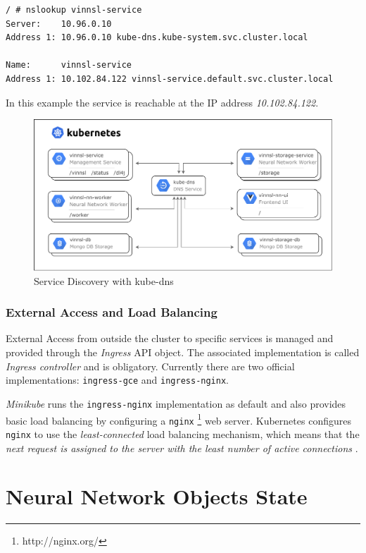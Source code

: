 \begin{verbatim}
/ # nslookup vinnsl-service
Server:    10.96.0.10
Address 1: 10.96.0.10 kube-dns.kube-system.svc.cluster.local

Name:      vinnsl-service
Address 1: 10.102.84.122 vinnsl-service.default.svc.cluster.local
\end{verbatim}

In this example the service is reachable at the IP address
\emph{10.102.84.122}.

\begin{figure}
\centering
\includegraphics[width=15.00000cm]{images/overview_main_services}
\caption{Service Discovery with kube-dns \label{img.service-discovery}}
\end{figure}

\subsubsection{External Access and Load
Balancing}\label{external-access-and-load-balancing}

External Access from outside the cluster to specific services is managed
and provided through the \emph{Ingress} API object. The associated
implementation is called \emph{Ingress controller} and is obligatory.
Currently there are two official implementations: \texttt{ingress-gce}
and \texttt{ingress-nginx}. \cite{kub-ingress}

\emph{Minikube} runs the \texttt{ingress-nginx} implementation as
default and also provides basic load balancing by configuring a
\texttt{nginx} \footnote{http://nginx.org/} web server. Kubernetes
configures \texttt{nginx} to use the \emph{least-connected} load
balancing mechanism, which means that the \emph{next request is assigned
to the server with the least number of active connections}
\cite{nginx-loadbal}.

\section{Neural Network Objects
State}\label{neural-network-objects-state}

